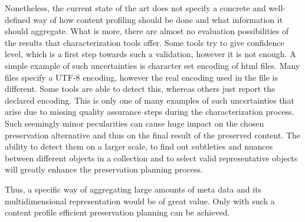 Nonetheless, the current state of the art does not specify a concrete and well-defined way of how content profiling should be done and what information it should aggregate. What is more, there are almost no evaluation possibilities of the results that characterization tools offer. Some tools try to give confidence level, which is a first step towards such a validation, however it is not enough. A simple example of such uncertainties is character set encoding of html files. Many files specify a UTF-8 encoding, however the real encoding used in the file is different. Some tools are able to detect this, whereas others just report the declared encoding. This is only one of many examples of such uncertainties that arise due to missing quality assurance steps during the characterization process. Such seemingly minor pecularities can cause huge impact on the chosen preservation alternative and thus on the final result of the preserved content. The ability to detect them on a larger scale, to find out subtleties and nuances between different objects in a collection and to select valid representative objects will greatly enhance the preservation planning process.

Thus, a specific way of aggregating large amounts of meta data and its multidimensional representation would be of great value. Only with such a content profile efficient preservation planning can be achieved.

